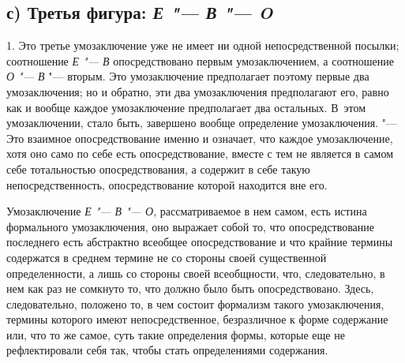 \subsection[с) Третья фигура]
{с) Третья фигура: {\em Е "--- В "--- O}}

1. Это третье умозаключение уже не имеет ни одной
непосредственной посылки; соотношение {\em Е "--- В}
опосредствовано первым умозаключением, а соотношение
{\em О "--- В} "--- вторым. Это умозаключение предполагает поэтому первые два
умозаключения; но и обратно, эти два умозаключения предполагают его, равно
как и вообще каждое умозаключение предполагает два остальных. В~этом
умозаключении, стало быть, завершено вообще определение умозаключения.
"--- Это взаимное опосредствование именно и означает, что каждое
умозаключение, хотя оно само по себе есть опосредствование, вместе с тем не
является в самом себе тотальностью опосредствования, а содержит в себе
такую непосредственность, опосредствование которой находится вне его.

Умозаключение {\em Е "--- В "--- О}, рассматриваемое в нем
самом, есть истина формального умозаключения, оно выражает собой то, что
опосредствование последнего есть абстрактно всеобщее опосредствование и что
крайние термины содержатся в среднем термине не со стороны своей
существенной определенности, а лишь со стороны своей всеобщности, что,
следовательно, в нем как раз не сомкнуто то, что должно было быть
опосредствовано. Здесь, следовательно, положено то, в чем состоит формализм
такого умозаключения, термины которого имеют
непосредственное, безразличное к форме содержание или, что то же самое,
суть такие определения формы, которые еще не рефлектировали себя так, чтобы
стать определениями содержания.

